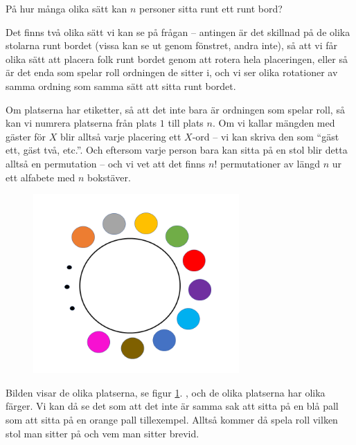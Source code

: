 \documentclass{tufte-handout}
\begin{document}
\begin{example}
	På hur många olika sätt kan $n$ personer sitta runt ett runt bord?

	Det finns två olika sätt vi kan se på frågan -- antingen är det skillnad på de olika stolarna runt bordet (vissa kan se ut genom fönstret, andra inte), så att vi får olika sätt att placera folk runt bordet genom att rotera hela placeringen, eller så är det enda som spelar roll ordningen de sitter i, och vi ser olika rotationer av samma ordning som samma sätt att sitta runt bordet.

	Om platserna har etiketter, så att det inte bara är ordningen som spelar roll, så kan vi numrera platserna från plats $1$ till plats $n$. Om vi kallar mängden med gäster för $X$ blir alltså varje placering ett $X$-ord -- vi kan skriva den som ``gäst ett, gäst två, etc.''. Och eftersom varje person bara kan sitta på en stol blir detta alltså en permutation -- och vi vet att det finns $n!$ permutationer av längd $n$ ur ett alfabete med $n$ bokstäver.
 
\begin{figure}[h]
\includegraphics[width=0.7\textwidth]{graphics/bordmedfarg1.png}
\label{fig:3}
\end{figure}


        Bilden visar de olika platserna, se figur \ref{fig:3}. , och de olika platserna har olika färger. Vi kan då se det som att det inte är samma sak att sitta på en blå pall som att sitta på en orange pall tillexempel. Alltså kommer då spela roll vilken stol man sitter på och vem man sitter brevid. 


\end{example}
\end{document}
